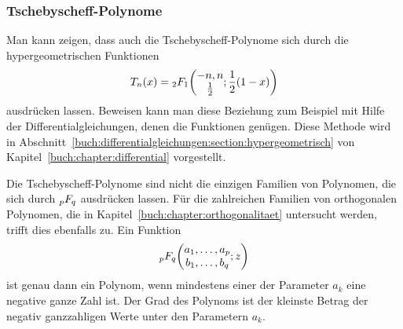 \subsubsection{Tschebyscheff-Polynome}
%
Man kann zeigen, dass auch die Tschebyscheff-Polynome sich durch die
hypergeometrischen Funktionen
\begin{equation}
T_n(x)
=
\mathstrut_2F_1\biggl(
\begin{matrix}-n,n\\\frac12\end{matrix}
;
\frac12(1-x)
\biggr)
\label{buch:rekursion:hypergeometrisch:tschebyscheff2f1}
\end{equation}
ausdrücken lassen.
Beweisen kann man diese Beziehung zum Beispiel mit Hilfe der
Differentialgleichungen, denen die Funktionen genügen.
Diese Methode wird in
Abschnitt~\ref{buch:differentialgleichungen:section:hypergeometrisch}
von Kapitel~\ref{buch:chapter:differential} vorgestellt.

Die Tschebyscheff-Polynome sind nicht die einzigen Familien von Polynomen,
die sich durch $\mathstrut_pF_q$ ausdrücken lassen.
Für die zahlreichen Familien von orthogonalen Polynomen, die in
Kapitel~\ref{buch:chapter:orthogonalitaet} untersucht werden,
trifft dies ebenfalls zu.
Ein Funktion
\[
\mathstrut_pF_q
\biggl(
\begin{matrix}
a_1,\dots,a_p\\
b_1,\dots,b_q
\end{matrix}
;z
\biggr)
\]
ist genau dann ein Polynom, wenn mindestens einer der Parameter
$a_k$ eine negative ganze Zahl ist.
Der Grad des Polynoms ist der kleinste Betrag der negativ ganzzahligen
Werte unter den Parametern $a_k$.

%
%
